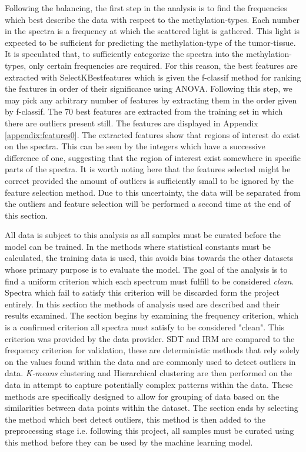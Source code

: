 Following the balancing, the first step in the analysis is to find the frequencies which best describe the data with respect to the methylation-types. Each number in the spectra is a frequency at which the scattered light is gathered. This light is expected to be sufficient for predicting the methylation-type of the tumor-tissue. It is speculated that, to sufficiently categorize the spectra into the methylation-types, only certain frequencies are required. For this reason, the best features are extracted with SelectKBestfeatures \cite{scikit} which is given the f-classif method for ranking the features in order of their significance using ANOVA. Following this step, we may pick any arbitrary number of features by extracting them in the order given by f-classif. The 70 best features are extracted from the training set in which there are outliers present still. The features are displayed in Appendix \ref{appendix:features0}. The extracted features show that regions of interest do exist on the spectra. This can be seen by the integers which have a successive difference of one, suggesting that the region of interest exist somewhere in specific parts of the spectra. It is worth noting here that the features selected might be correct provided the amount of outliers is sufficiently small to be ignored by the feature selection method. Due to this uncertainty, the data will be separated from the outliers and feature selection will be performed a second time at the end of this section.

All data is subject to this analysis as all samples must be curated before the model can be trained. In the methods where statistical constants must be calculated, the training data is used, this avoids bias towards the other datasets whose primary purpose is to evaluate the model. The goal of the analysis is to find a uniform criterion which each spectrum must fulfill to be considered \textit{clean}. Spectra which fail to satisfy this criterion will be discarded form the project entirely. In this section the methods of analysis used are described and their results examined. The section begins by examining the frequency criterion, which is a confirmed criterion all spectra must satisfy to be considered "clean". This criterion was provided by the data provider. SDT and IRM are compared to the frequency criterion for validation, these are deterministic methods that rely solely on the values found within the data and are commonly used to detect outliers in data. \textit{K-means} clustering and Hierarchical clustering are then performed on the data in attempt to capture potentially complex patterns within the data. These methods are specifically designed to allow for grouping of data based on the similarities between data points within the dataset. The section ends by selecting the method which best detect outliers, this method is then added to the preprocessing stage i.e. following this project, all samples must be curated using this method before they can be used by the machine learning model. 

